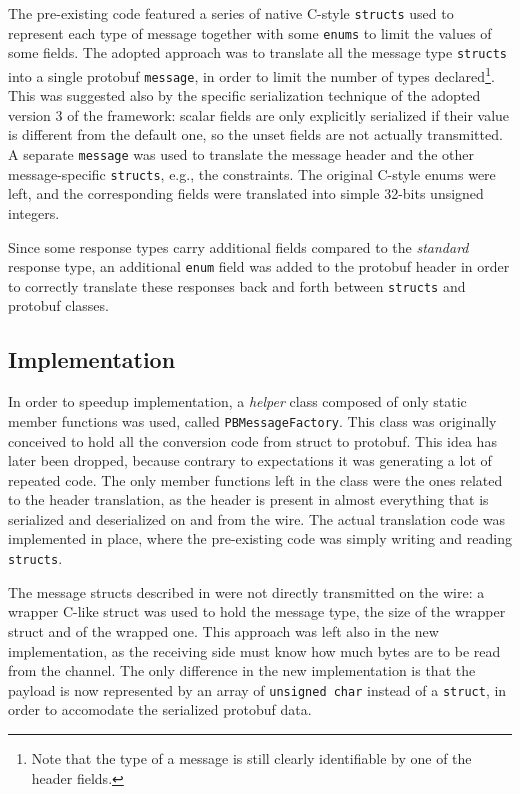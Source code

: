 The pre-existing code featured a series of native C-style \texttt{structs} used to represent each type of message together with some \texttt{enums} to limit the values of some fields. The adopted approach was to translate all the message type \texttt{structs} into a single protobuf \texttt{message}, in order to limit the number of types declared\footnote{Note that the type of a message is still clearly identifiable by one of the header fields.}. This was suggested also by the specific serialization technique of the adopted version 3 of the framework: scalar fields are only explicitly serialized if their value is different from the default one, so the unset fields are not actually transmitted. A separate \texttt{message} was used to translate the message header and the other message-specific \texttt{structs}, e.g.,  the constraints. The original C-style enums were left, and the corresponding fields were translated into simple 32-bits unsigned integers.

Since some response types carry additional fields compared to the \emph{standard} response type, an additional \texttt{enum} field was added to the protobuf header in order to correctly translate these responses back and forth between \texttt{structs} and protobuf classes.

\subsection{Implementation}

In order to speedup implementation, a \emph{helper} class composed of only static member functions was used, called \texttt{PBMessageFactory}. This class was originally conceived to hold all the conversion code from struct to protobuf. This idea has later been dropped, because contrary to expectations it was generating a lot of repeated code. The only member functions left in the class were the ones related to the header translation, as the header is present in almost everything that is serialized and deserialized on and from the wire. The actual translation code was implemented in place, where the pre-existing code was simply writing and reading \texttt{structs}.

The message structs described in  were not directly transmitted on the wire: a wrapper C-like struct was used to hold the message type, the size of the wrapper struct and of the wrapped one. This approach was left also in the new implementation, as the receiving side must know how much bytes are to be read from the channel. The only difference in the new implementation is that the payload is now represented by an array of \texttt{unsigned char} instead of a \texttt{struct}, in order to accomodate the serialized protobuf data.

